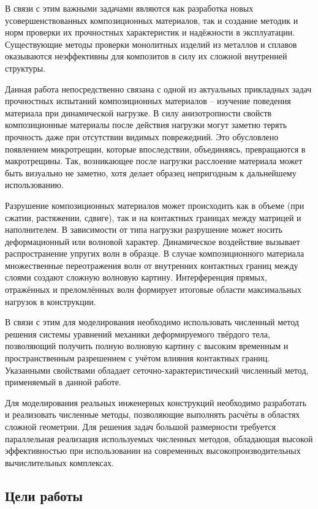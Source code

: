 В связи с этим важными задачами являются как разработка новых усовершенствованных 
композиционных материалов, так и создание методик и норм проверки их прочностных характеристик 
и надёжности в эксплуатации. Существующие методы проверки монолитных изделий из металлов и сплавов оказываются неэффективны для композитов в силу их сложной внутренней структуры.

Данная работа непосредственно связана с одной из актуальных прикладных задач 
прочностных испытаний композиционных материалов -- изучение поведения материала при 
динамической нагрузке. В силу анизотропности свойств композиционные материалы после
действия нагрузки могут заметно терять прочность даже при отсутствии видимых поврежедний.
Это обусловлено появлением микротрещин, которые впоследствии, объединяясь,
превращаются в макротрещины. Так, возникающее после нагрузки расслоение
материала может быть визуально не заметно, хотя делает образец непригодным к
дальнейшему использованию.

Разрушение композиционных материалов может происходить как в объеме (при сжатии, растяжении, 
сдвиге), так и на контактных границах между матрицей и наполнителем. В зависимости от типа 
нагрузки разрушение может носить деформационный или волновой характер. 
Динамическое воздействие вызывает распространение упругих волн в образце. В случае 
композиционного материала множественные переотражения волн от внутренних контактных 
границ между слоями создают сложную волновую картину. Интерференция прямых, отражённых 
и преломлённых волн формирует итоговые области максимальных нагрузок в конструкции.

В связи с этим для моделирования необходимо использовать численный метод решения системы 
уравнений механики деформируемого твёрдого тела, позволяющий получить полную волновую 
картину с высоким временным и пространственным разрешением с учётом влияния контактных 
границ. Указанными свойствами обладает сеточно-характеристический численный метод, 
применяемый в данной работе.

Для моделирования реальных инженерных конструкций необходимо разработать и реализовать численные методы, позволяющие выполнять расчёты в областях сложной геометрии. Для решения задач большой размерности требуется параллельная реализация используемых численных методов, обладающая высокой эффективностью при использовании на современных высокопроизводительных вычислительных комплексах.

\subsection*{Цели работы}

